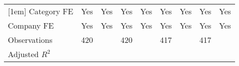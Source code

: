 {\begin{tabular}{l*{8}{c}}
[1em]
Category FE                        &       Yes         &       Yes         &       Yes         &       Yes         &       Yes         &       Yes         &       Yes         &       Yes         \\
[1em]
Company FE                         &       Yes         &       Yes         &       Yes         &       Yes         &       Yes         &       Yes         &       Yes         &       Yes         \\
\hline
Observations                       &       420         &                   &       420         &                   &       417         &                   &       417         &                   \\
Adjusted \(R^{2}\)                 &                   &                   &                   &                   &                   &                   &                   &                   \\
\hline\hline
\end{tabular}
}
